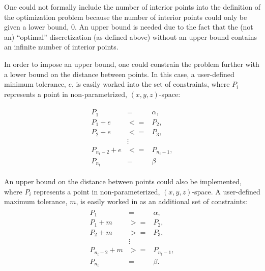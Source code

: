 One could not formally include the number of interior points into the 
definition of the optimization problem because the number of interior 
points could only be given a lower bound, 0.  An upper bound is needed due 
to the fact that the (not an) ``optimal'' discretization (as defined 
above) without an upper bound contains an infinite number of interior 
points.  

In order to impose an upper bound, one could constrain the problem further 
with a lower bound on the distance between points.  In this case, 
a user-defined minimum tolerance, $e$, is easily worked into the set of 
constraints, where $P_i$ represents a point in non-parametrized, $(x,y,z)$-space:

\begin{eqnarray*}
\begin{array}{rcl}
P_1 & = & \alpha,\\
P_1+e & <= & P_2, \\ 
P_2+e & <= & P_3, \\ 
& \vdots & \\
P_{n_t-2}+ e & <= & P_{n_t-1}, \\
P_{n_t} & = & \beta
\end{array}
\end{eqnarray*}

An upper bound on the distance between points could also be implemented, 
where $P_i$ represents a point in non-parameterized, $(x,y,z)$-space.
A user-defined maximum tolerance, $m$, is easily worked in as an 
additional set of constraints: 
\begin{eqnarray*}
\begin{array}{rcl}
P_1 & = & \alpha, \\ 
P_1+m & >= & P_2, \\
P_2+m & >= & P_3, \\ 
& \vdots & \\
P_{n_t-2}+ m & >= & P_{n_t-1}, \\
P_{n_t} & = & \beta.
\end{array}
\end{eqnarray*}

